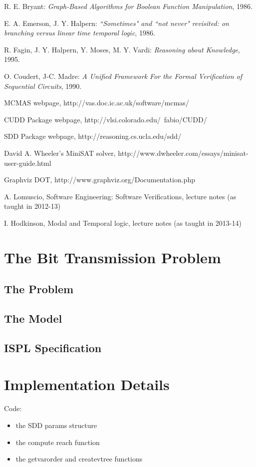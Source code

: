 \documentclass[11pt]{article}
\begin{document}
\begin{thebibliography}{9}
 R. E. Bryant: \textit{Graph-Based Algorithms
for Boolean Function Manipulation}, 1986.

  	E. A. Emerson, J. Y. Halpern:\textit{
``Sometimes" and ``not never" revisited: on branching versus linear time temporal logic}, 1986.
	
R. Fagin, J. Y. Halpern, Y. Moses, M. Y. Vardi: \textit{Reasoning about Knowledge}, 1995.

 O. Coudert, J-C. Madre: \textit{A Unified Framework For the Formal Verification of Sequential Circuits}, 1990.

 MCMAS webpage, http://vas.doc.ic.ac.uk/software/mcmas/

 CUDD Package webpage, http://vlsi.colorado.edu/~fabio/CUDD/

 SDD Package webpage, http://reasoning.cs.ucla.edu/sdd/

 David A. Wheeler's MiniSAT solver,  http://www.dwheeler.com/essays/minisat-user-guide.html

Graphviz DOT, http://www.graphviz.org/Documentation.php

 A. Lomuscio, Software Engineering: Software Verifications, lecture notes (as taught in 2012-13)

 I. Hodkinson, Modal and Temporal logic, lecture notes (as taught in 2013-14)

\end{thebibliography}

\appendix

\section{The Bit Transmission Problem}
\label{BTP}
\subsection{The Problem}

\subsection{The Model}

\subsection{ISPL Specification}

\section{Implementation Details}

Code:
\begin{itemize}
\item the SDD params structure
\item the compute reach function
\item the getvarorder and createvtree functions
\end{itemize}
\end{document}
